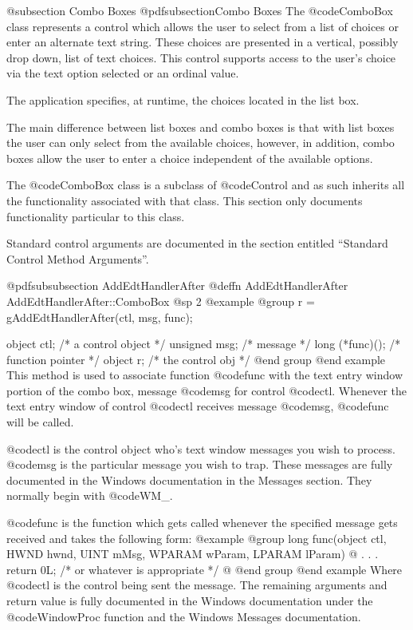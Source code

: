 @subsection Combo Boxes
@pdfsubsection{Combo Boxes}
The @code{ComboBox} class represents a control which allows the user to
select from a list of choices or enter an alternate text string.  These
choices are presented in a vertical, possibly drop down, list of text
choices.  This control supports access to the user's choice via the text
option selected or an ordinal value.

The application specifies, at runtime, the choices located in the list box.

The main difference between list boxes and combo boxes is that with list
boxes the user can only select from the available choices, however, in
addition, combo boxes allow the user to enter a choice independent of
the available options.

The @code{ComboBox} class is a subclass of @code{Control} and as such
inherits all the functionality associated with that class.  This section
only documents functionality particular to this class.

Standard control arguments are documented in the section entitled
``Standard Control Method Arguments''.










@pdfsubsubsection {AddEdtHandlerAfter}
@deffn {AddEdtHandlerAfter} AddEdtHandlerAfter::ComboBox
@sp 2
@example
@group
r = gAddEdtHandlerAfter(ctl, msg, func);

object   ctl;      /*  a control object  */
unsigned msg;      /*  message           */
long    (*func)(); /*  function pointer  */
object  r;         /*  the control obj   */
@end group
@end example
This method is used to associate function @code{func} with the text
entry window portion of the combo box, message @code{msg} for
control @code{ctl}.  Whenever the text entry window of control
@code{ctl} receives message @code{msg}, @code{func} will be called.

@code{ctl} is the control object who's text window messages you wish to
process.  @code{msg} is the particular message you wish to trap.  These
messages are fully documented in the Windows documentation in the
Messages section.  They normally begin with @code{WM_}.

@code{func} is the function which gets called whenever the specified
message gets received and takes the following form:
@example
@group
long    func(object     ctl,
             HWND       hwnd, 
             UINT       mMsg, 
             WPARAM     wParam, 
             LPARAM     lParam)
@{
        .
        .
        .
        return 0L;  /* or whatever is appropriate  */
@}
@end group
@end example
Where @code{ctl} is the control being sent the message.  The remaining
arguments and return value is fully documented in the Windows documentation
under the @code{WindowProc} function and the Windows Messages documentation.

